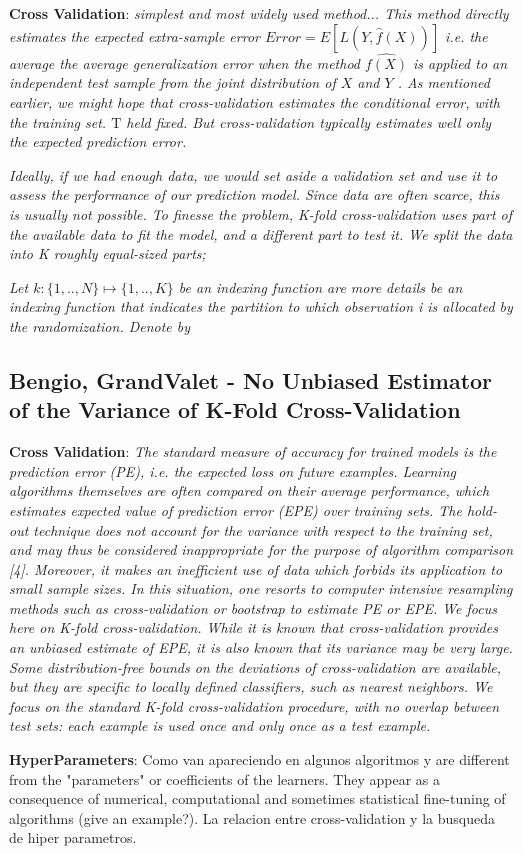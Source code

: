 \textbf{Cross Validation}:  
\textit{simplest and most widely used method... This method directly estimates the expected extra-sample error
$Error = E[L(Y,\hat{f}(X))] $ i.e. the average the average generalization error when the method $\hat{f(X)}$ is applied to an independent test sample from the joint distribution of $X$ and $Y$ . As mentioned earlier, we might hope that cross-validation estimates the conditional error, with the training set. $\mathrm{T}$ held fixed. But cross-validation typically estimates well only the expected prediction error.}

\textit{Ideally, if we had enough data, we would set aside a validation set and use it to assess the performance of our prediction model. Since data are often scarce, this is usually not possible. To finesse the problem, K-fold cross-validation uses part of the available data to fit the model, and a different part to test it. We split the data into K roughly equal-sized parts; }

\textit{Let $k : \{1,..,N\} \mapsto \{1, .., K\}$ be an indexing function are more details be an indexing
function that indicates the partition to which observation i is allocated by the randomization. Denote by}


\subsection{Bengio, GrandValet - No Unbiased Estimator of the Variance of K-Fold Cross-Validation}
\textbf{Cross Validation}: 
\textit{The standard measure of accuracy for trained models is the prediction error (PE), i.e. the expected loss on future examples. Learning algorithms themselves are often compared on their average performance, which estimates expected value of prediction error (EPE) over training sets.
The hold-out technique does not account for the variance with respect to the training set, and may thus be considered inappropriate for the purpose of algorithm comparison [4]. Moreover, it makes an inefficient use of data which forbids its application to small sample sizes. In this situation, one resorts to computer intensive resampling methods such as cross-validation or bootstrap to estimate PE or EPE. We focus here on K-fold cross-validation. While it is known that cross-validation provides an unbiased estimate of EPE, it is also known that its variance may be very large.
Some distribution-free bounds on the deviations of cross-validation are available, but they are specific to locally defined classifiers, such as nearest neighbors.
We focus on the standard K-fold cross-validation procedure, with no overlap between test sets: each example is used once and only once as a test example.
}


\textbf{HyperParameters}:
Como van apareciendo en algunos algoritmos y are different from the "parameters" or coefficients of the learners. They appear as a consequence of numerical, computational and sometimes statistical fine-tuning of algorithms (give an example?). 
La relacion entre cross-validation y la busqueda de hiper parametros. 

\textit{}

\textit{}


